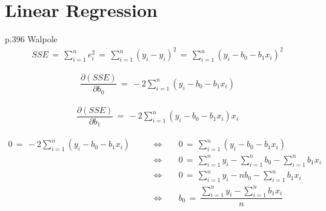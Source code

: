 \section{Linear Regression}

p.396 Walpole \\[2ex]
\begin{align*}
    SSE \hspace{2pt} = \hspace{2pt} \sum_{i = 1}^{n} e_{i}^{2} \hspace{2pt} = \hspace{2pt} \sum_{i = 1}^{n} (y_{i} - \hat{y}_{i})^{2} \hspace{2pt} = \hspace{2pt} \sum_{i = 1}^{n} (y_{i} - b_{0} - b_{1}x_{i})^{2}
\end{align*}

\begin{align*}
    \dfrac{\partial (SSE)}{\partial b_{0}} \hspace{2pt} = \hspace{2pt} -2 \sum_{i = 1}^{n} (y_{i} - b_{0} - b_{1}x_{i})
\end{align*}

\begin{align*}
    \dfrac{\partial (SSE)}{\partial b_{1}} \hspace{2pt} = \hspace{2pt} -2 \sum_{i = 1}^{n} (y_{i} - b_{0} - b_{1}x_{i})x_{i}
\end{align*}

\begin{align*}
    0 \hspace{2pt} = \hspace{2pt} -2 \sum_{i = 1}^{n} (y_{i} - b_{0} - b_{1}x_{i}) \hspace{20pt} &\Longleftrightarrow \hspace{20pt} 0 \hspace{2pt} = \hspace{2pt} \sum_{i = 1}^{n} (y_{i} - b_{0} - b_{1}x_{i}) \\[1ex]
    &\Longleftrightarrow \hspace{20pt} 0 \hspace{2pt} = \hspace{2pt} \sum_{i = 1}^{n} y_{i} - \sum_{i = 1}^{n} b_{0} - \sum_{i = 1}^{n} b_{1}x_{i} \\[1ex]
    &\Longleftrightarrow \hspace{20pt} 0 \hspace{2pt} = \hspace{2pt} \sum_{i = 1}^{n} y_{i} - nb_{0} - \sum_{i = 1}^{n} b_{1}x_{i} \\[1ex]
    &\Longleftrightarrow \hspace{20pt} b_{0} \hspace{2pt} = \hspace{2pt} \dfrac{\sum_{i = 1}^{n} y_{i} - \sum_{i = 1}^{n} b_{1}x_{i}}{n}
\end{align*}

